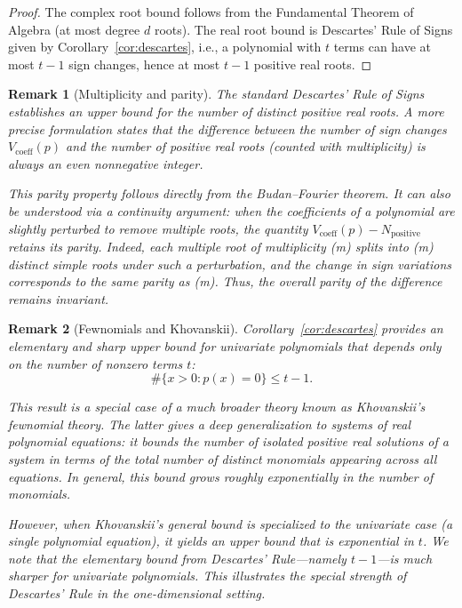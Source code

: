 \documentclass[11pt]{article}
\newtheorem{remark}{Remark}
\begin{document}
\begin{proof}
The complex root bound follows from the Fundamental Theorem of Algebra (at most degree \( d \) roots). The real root bound is Descartes' Rule of Signs given by Corollary~\ref{cor:descartes}, i.e., a polynomial with \( t \) terms can have at most \( t-1 \) sign changes, hence at most \( t-1 \) positive real roots.
\end{proof}


\begin{remark}[Multiplicity and parity]
The standard Descartes' Rule of Signs establishes an upper bound for the number of \emph{distinct} positive real roots. A more precise formulation states that the difference between the number of sign changes \( V_{\mathrm{coeff}}(p) \) and the number of positive real roots (\emph{counted with multiplicity}) is always an \emph{even nonnegative integer}.


This parity property follows directly from the Budan–Fourier theorem. It can also be understood via a continuity argument: when the coefficients of a polynomial are slightly perturbed to remove multiple roots, the quantity $V_{\mathrm{coeff}}(p) - N_{\mathrm{positive}}$ 
retains its parity. Indeed, each multiple root of multiplicity (m) splits into (m) distinct simple roots under such a perturbation, and the change in sign variations corresponds to the same parity as (m). Thus, the overall parity of the difference remains invariant.
%
\end{remark}

\begin{remark}[Fewnomials and Khovanskii]
Corollary~\ref{cor:descartes} provides an elementary and \emph{sharp} upper bound for univariate polynomials that depends only on the number of nonzero terms \( t \):
\[
\#\{ x > 0 : p(x) = 0 \} \le t - 1.
\]

This result is a special case of a much broader theory known as \emph{Khovanskii's fewnomial theory}. The latter gives a deep generalization to \emph{systems} of real polynomial equations: it bounds the number of isolated positive real solutions of a system in terms of the total number of \emph{distinct monomials} appearing across all equations. In general, this bound grows roughly exponentially in the number of monomials.

However, when Khovanskii's general bound is specialized to the univariate case (a single polynomial equation), it yields an upper bound that is exponential in \( t \). We note that the elementary bound from Descartes' Rule—namely \( t - 1 \)—is much sharper for univariate polynomials. This illustrates the special strength of Descartes' Rule in the one-dimensional setting.
\end{remark}
\end{document}
